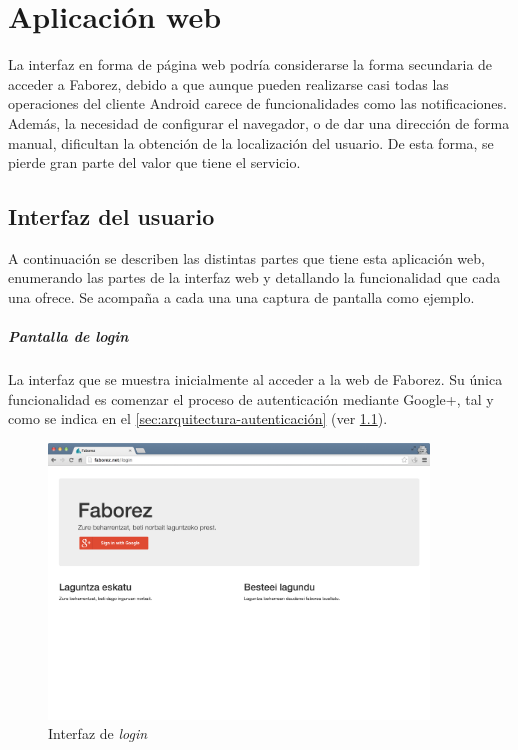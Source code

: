 \documentclass[main]{subfiles}
\begin{document}
\chapter{Aplicación web}

La interfaz en forma de página web podría considerarse la forma secundaria de acceder a Faborez, debido a que aunque pueden realizarse casi todas las operaciones del cliente Android carece de funcionalidades como las notificaciones. Además, la necesidad de configurar el navegador, o de dar una dirección de forma manual, dificultan la obtención de la localización del usuario. De esta forma, se pierde gran parte del valor que tiene el servicio.

\section{Interfaz del usuario}

A continuación se describen las distintas partes que tiene esta aplicación web, enumerando las partes de la interfaz web y detallando la funcionalidad que cada una ofrece. Se acompaña a cada una una captura de pantalla como ejemplo.

\paragraph{Pantalla de \emph{login}}
La interfaz que se muestra inicialmente al acceder a la web de Faborez. Su única funcionalidad es comenzar el proceso de autenticación mediante Google+, tal y como se indica en el \cref{sec:arquitectura-autenticación} (ver \cref{fig:webapp-login}).

\begin{figure}
  \centering
  \includegraphics[width=0.9\textwidth]{images/webapp-login}
  \caption{Interfaz de \emph{login}}
  \label{fig:webapp-login}
\end{figure}
\end{document}
